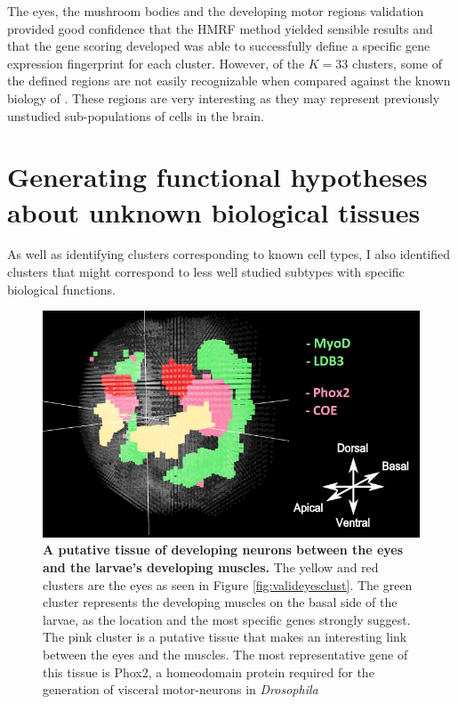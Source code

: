 	The eyes, the mushroom bodies and the developing motor regions validation provided good confidence that the HMRF method yielded sensible results and that the gene scoring developed was able to successfully define a specific gene expression fingerprint for each cluster. However, of the $K=33$ clusters, some of the defined regions are not easily recognizable when compared against the known biology of \platy{}. These regions are very interesting as they may represent previously unstudied sub-populations of cells in the brain. 



	\section{Generating functional hypotheses about unknown biological tissues}
	As well as identifying clusters corresponding to known cell types, I also identified clusters that might correspond to less well studied subtypes with specific biological functions. \\
	
	\begin{figure}[H]
\centerline{\includegraphics[width=0.8\linewidth]{gfx/chapter6/eyes_muscles.png}}
\caption{{\bf A putative tissue of developing neurons between the eyes and the larvae's developing muscles.} The yellow and red clusters are the eyes as seen in Figure \ref{fig:valideyesclust}. The green cluster represents the developing muscles on the basal side of the larvae, as the location and the most specific genes strongly suggest. The pink cluster is a putative tissue that makes an interesting link between the eyes and the muscles. The most representative gene of this tissue is Phox2, a homeodomain protein required for the generation of visceral motor-neurons in \emph{Drosophila} \citep{briscoe99}}
\label{fig:eyes_muscles}
	\end{figure}

